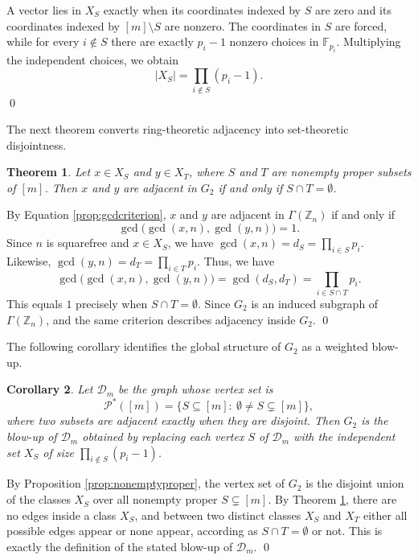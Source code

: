\documentclass[12pt]{article}
\renewenvironment{proof}{{\bf \noindent Proof.}}{\qed}
\newtheorem{theorem}{Theorem}[section]
\newtheorem{corollary}[theorem]{Corollary}
\theoremstyle{definition}
\newcommand{\F}{\mathbb F}
\begin{document}
	\begin{proof}
		A vector lies in $X_S$ exactly when its coordinates indexed by $S$ are zero and its coordinates indexed by $[m]\setminus S$ are nonzero. The coordinates in $S$ are forced, while for every $i\notin S$ there are exactly $p_i-1$ nonzero choices in $\F_{p_i}$. Multiplying the independent choices, we obtain
		$$
		|X_S|=\prod_{i\notin S}(p_i-1).
		$$
	\end{proof}
	
	\medskip
	 The next theorem converts ring-theoretic adjacency into set-theoretic disjointness.	
	\begin{theorem}\label{thm:adjdisjoint}
		Let $x\in X_S$ and $y\in X_T$, where $S$ and $T$ are nonempty proper subsets of $[m]$. Then $x$ and $y$ are adjacent in $G_2$ if and only if $S\cap T=\emptyset$.
	\end{theorem}
	
	\begin{proof}
		By Equation \ref{prop:gcdcriterion}, $x$ and $y$ are adjacent in $\Gamma(\mathbb Z_n)$ if and only if
		$$
		\gcd\big(\gcd(x,n),\gcd(y,n)\big)=1.
		$$
		Since $n$ is squarefree and $x\in X_S$, we have $\gcd(x,n)=d_S=\prod_{i\in S}p_i$. Likewise, $\gcd(y,n)=d_T=\prod_{i\in T}p_i$. Thus, we have
		$$
		\gcd\big(\gcd(x,n),\gcd(y,n)\big)=\gcd(d_S,d_T)=\prod_{i\in S\cap T}p_i.
		$$
		This equals $1$ precisely when $S\cap T=\emptyset$. Since $G_2$ is an induced subgraph of $\Gamma(\mathbb Z_n)$, and the same criterion describes adjacency inside $G_2$.
	\end{proof}
	
	\medskip
	 The following corollary identifies the global structure of $G_2$ as a weighted blow-up.	
	\begin{corollary}\label{cor:blowup}
		Let $\mathcal D_m$ be the graph whose vertex set is
		$$
		\mathscr P^\ast([m])=\{S\subseteq [m]:\ \emptyset\neq S\subsetneq [m]\},
		$$
		where two subsets are adjacent exactly when they are disjoint. Then $G_2$ is the blow-up of $\mathcal D_m$ obtained by replacing each vertex $S$ of $\mathcal D_m$ with the independent set $X_S$ of size $\prod_{i\notin S}(p_i-1)$.
	\end{corollary}
	
	\begin{proof}
		By Proposition \ref{prop:nonemptyproper}, the vertex set of $G_2$ is the disjoint union of the classes $X_S$ over all nonempty proper $S\subsetneq [m]$. By Theorem \ref{thm:adjdisjoint}, there are no edges inside a class $X_S$, and between two distinct classes $X_S$ and $X_T$ either all possible edges appear or none appear, according as $S\cap T=\emptyset$ or not. This is exactly the definition of the stated blow-up of $\mathcal D_m$.
	\end{proof}
	
\end{document}
